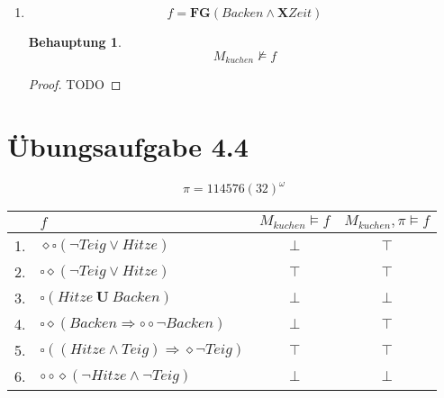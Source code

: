 \documentclass[a4paper]{scrartcl}
\newtheorem*{behaupt}{Behauptung}
\begin{document}
\begin{enumerate}
    \item
        \begin{equation}
            f = \textbf{FG}(Backen \land \textbf{X}Zeit)
        \end{equation}

        \begin{behaupt}
            \begin{equation}
                M_{kuchen} \not\models f
            \end{equation}
        \end{behaupt}

        \begin{proof}
            TODO
        \end{proof}

\end{enumerate}

\section*{Übungsaufgabe 4.4}
\begin{equation*}
    \pi = 114576(32)^\omega
\end{equation*}

\begin{table}[h]
    \centering
    \begin{tabular}{r|l|c|c}
           & $f$ & $M_{kuchen} \models  f$ & $M_{kuchen}, \pi \models  f$ \\ \hline
        1. & $\diamond\square(\lnot Teig \lor Hitze)$                     & $\bot$ & $\top$ \\
        2. & $\square\diamond(\lnot Teig \lor Hitze)$                     & $\top$ & $\top$ \\
        3. & $\square(Hitze ~\textbf{U}~ Backen)$                         & $\bot$ & $\bot$ \\
        4. & $\square\diamond(Backen \Rightarrow \circ\circ\lnot Backen)$ & $\bot$ & $\top$ \\
        5. & $\square((Hitze \land Teig) \Rightarrow \diamond\lnot Teig)$ & $\top$ & $\top$ \\
        6. & $\circ\circ\diamond(\lnot Hitze \land \lnot Teig)$           & $\bot$ & $\bot$ \\
    \end{tabular}
\end{table}
\end{document}
